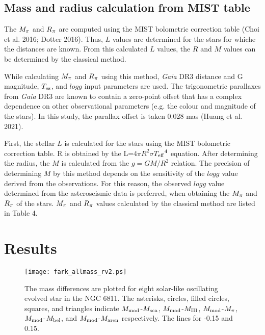 \documentclass[a4paper,fleqn,usenatbib]{mnras}     %
\begin{document}
{\subsection{Mass and radius calculation from MIST table}
The $M_{\rm \pi}$ and $R_{\rm \pi}$ are computed using the MIST bolometric correction table 
(Choi et al. 2016; Dotter 2016). 
Thus, $L$ values are determined for 
the stars for whiche the distances are known.
From this calculated $L$ values, the $R$ and $M$ values
 can be determined by the classical method.

While calculating $M_{\rm \pi}$ and $R_{\rm \pi}$ using 
this method, {\emph{Gaia}} DR3 distance and 
G magnitude, ${T_{\rm es}}$, and $log g$ input parameters are used. 
The trigonometric parallaxes from 
{\emph{Gaia}} DR3 are known to contain 
a zero-point offset that has a complex dependence 
on other observational parameters (e.g. the colour and magnitude of the stars).
In this study, the parallax 
offset is taken 0.028 mas (Huang et al. 2021).

First, the stellar $L$ is calculated 
for the stars using the MIST bolometric correction table.
R is obtained by the L=4$\pi$$R^2$$\sigma$${T_{\rm eff}}^4$ equation. 
After determining the radius, the $M$ is calculated from the $g=GM/R^2$ relation.
The precision of determining $M$ by this method depends on the sensitivity of the $log g$ value derived from the observations.
For this reason, the observed $log g$ 
value determined from the asteroseismic data is preferred, 
when obtaining the $M_{\rm \pi}$ and $R_{\rm \pi}$ of the stars. 
$M_{\rm \pi}$ and $R_{\rm \pi}$ values
calculated by the classical method are listed in Table 4.



\section{Results}
\begin{figure}
\begin{center}
\texttt{[image: fark\_allmass\_rv2.ps]}
        \caption{The mass differences are plotted for eight solar-like oscillating evolved star in the NGC 6811. The asterisks, circles, filled circles, squares, and triangles indicate ${M_{\rm mod}}$-${M_{\rm sca}}$, ${M_{\rm mod}}$-${M_{\rm III}}$, ${M_{\rm mod}}$-${M_{\rm \pi}}$, ${M_{\rm mod}}$-${M_{\rm bel}}$, and ${M_{\rm mod}}$-${M_{\rm aren}}$ respectively. The lines for -0.15 and 0.15.
}
\end{center}
\end{figure}
}
\end{document}
